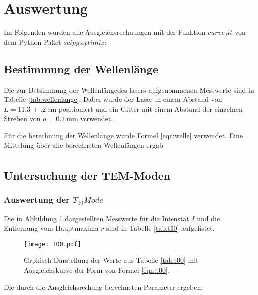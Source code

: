 \newpage
\section{Auswertung}

\label{sec:Auswertung}
Im Folgenden wurden alle Ausgleichsrechnungen mit der Funktion $curve_fit$ von dem
Python Paket $scipy.optimize$ %

\subsection{Bestimmung der Wellenlänge}
Die zur Betsimmung der Wellenlängedes lasers aufgenommenen Messwerte
sind in Tabelle \ref{tab:wellenlänge}. Dabei wurde der Laser in einem Abstand
von $L = \SI{11.3(2)}{\centi\meter}$ positioniert und ein Gitter mit einem Abstand der einzelnen
Streben von $a = \SI{0.1}{\milli\meter}$ verwendet.

%

Für die berechnung der Wellenlänge wurde Formel \ref{eqn:welle} verwendet.
Eine Mittelung über alle berechneten Wellenlängen ergab
\begin{align*}
\end{align*}


\subsection{Untersuchung der TEM-Moden}

\subsubsection{Auswertung der $T_{00} Mode$}
Die in Abbildung \ref{plt:t00} dargestellten Messwerte für die Intenstät $I$
und die Entfernung vom Hauptmaxima $r$ sind in Tabelle \ref{tab:t00}
aufgelistet.



\begin{figure}[htb]
  \centering
  \texttt{[image: T00.pdf]}
  \caption{Grphisch Darstellung der Werte aus Tabelle \ref{tab:t00} mit Ausgleichskurve der Form von Formel \ref{eqn:t00}.}
  \label{plt:t00}
\end{figure}

Die durch die Ausgleichsrechung berechneten Parameter ergeben:
\begin{align*}
\end{align*}

